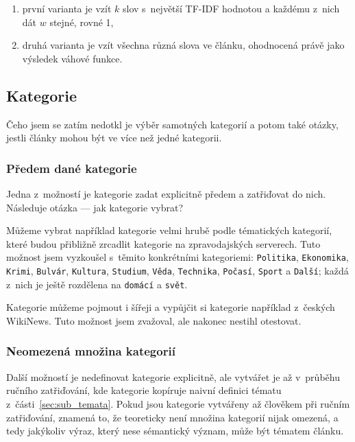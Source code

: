 \documentclass[12pt,a4paper]{report}
\begin{document}
\begin{enumerate}
    \item první varianta je vzít $k$ slov s~největší TF-IDF hodnotou a každému z~nich dát $w$ stejné, rovné 1,
    \item druhá varianta je vzít všechna různá slova ve článku, ohodnocená právě jako výsledek váhové funkce.
\end{enumerate}

\subsection{Kategorie}
\label{sec:jakekategorie}
Čeho jsem se zatím nedotkl je výběr samotných kategorií a potom také otázky, jestli články mohou být ve více než jedné kategorii. %

\subsubsection{Předem dané kategorie}
\label{sec:omezene_teorie}

Jedna z~možností je kategorie zadat explicitně předem a zatřiďovat do nich. Následuje otázka --- jak kategorie vybrat?

Můžeme vybrat například kategorie velmi hrubě podle tématických kategorií, které budou přibližně zrcadlit kategorie na zpravodajských serverech. Tuto možnost jsem vyzkoušel s~těmito konkrétními kategoriemi: \texttt{Politika}, \texttt{Ekonomika}, \texttt{Krimi}, \texttt{Bulvár}, \texttt{Kultura}, \texttt{Studium}, \texttt{Věda}, \texttt{Technika}, \texttt{Počasí}, \texttt{Sport} a \texttt{Další}; každá z~nich je ještě rozdělena na \texttt{domácí} a \texttt{svět}. 

Kategorie můžeme pojmout i šířeji a vypůjčit si kategorie například z~českých WikiNews. Tuto možnost jsem zvažoval, ale nakonec nestihl otestovat.


\subsubsection{Neomezená množina kategorií}
\label{sec:neomezene_teorie}

Další možností je nedefinovat kategorie explicitně, ale vytvářet je až v~průběhu ručního zatřiďování, kde  kategorie kopíruje naivní definici tématu z~čá\-sti~\ref{sec:sub_temata}. Pokud jsou kategorie vytvářeny až člověkem při ručním zatřiďování, znamená to, že teoreticky není množina kategorií nijak omezená, a tedy jakýkoliv výraz, který nese sémantický význam, může být tématem článku.
\end{document}
